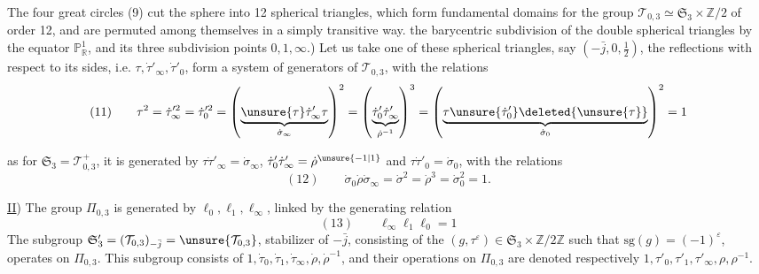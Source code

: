 
The four great circles (9) cut the sphere into 12 spherical triangles, which form fundamental domains for the group $\mathcal T_{0,3}\simeq\mathfrak S_3\times\mathbb Z/2$ of order 12, and are permuted among themselves in a simply transitive way.
 the barycentric subdivision of the double spherical triangles  by the equator $\mathbb P_{\mathbb R}^{1}$, and its three subdivision points $0,1,\infty$.)
Let us take one of these spherical triangles, say $(-\bar j,0,\frac12)$, the reflections with respect to its  sides, i.e.
$\tau,\dot\tau'_\infty,\dot\tau'_0$, form a system of generators of $\mathcal T_{0,3}$, with the relations
\[
(11)\qquad
\tau^2=\dot\tau_\infty^{\prime 2}=\dot\tau_0^{\prime 2}
=\left(\underbrace{\unsure{\tau}\dot\tau'_\infty\tau}_{\dot\sigma_\infty}\right)^2
=\left(\underbrace{\dot\tau'_0\dot\tau'_\infty}_{\dot\rho^{-1}}\right)^3
=\left(\underbrace{\tau\unsure{\dot\tau'_0}\deleted{\unsure{\tau}}}_{\dot\sigma_0}\right)^2=1
\]

as for $\mathfrak S_3=\mathcal T_{0,3}^{+}$, it is generated by
$\tau\dot\tau'_\infty=\dot\sigma_\infty$, $\dot\tau'_0\dot\tau'_\infty=\dot\rho^{\unsure{-1|1}}$ and $\tau\dot\tau'_0=\dot\sigma_0$, with the relations
\[
(12)\qquad
\dot\sigma_0\dot\rho\dot\sigma_\infty=\dot\sigma^2=\dot\rho^3=\dot\sigma_0^2=1.
\]

\uline{II}) The group $\Pi_{0,3}$ is generated by $\ell_0,\ell_1,\ell_\infty$, linked by the generating relation
\[
(13)\qquad \ell_\infty \ell_1\ell_0=1
\]
The  subgroup 
$\mathfrak S'_3=(\mathcal T_{0,3})_{-\bar j}=\unsure{\mathcal T_{0,3}}$,
stabilizer of $-\bar j$, consisting of the $(g,\tau^\varepsilon)\in\mathfrak S_3\times\mathbb Z/2\mathbb Z$ such that $\mathrm{sg}(g)=(-1)^\varepsilon$, operates on $\Pi_{0,3}$.
This subgroup consists of $1,\dot\tau_0,\dot\tau_1,\dot\tau_\infty,\dot\rho,\dot\rho^{-1}$, and their operations on $\Pi_{0,3}$ are denoted respectively $1,\tau'_0,\tau'_1,\tau'_\infty,\rho,\rho^{-1}$.



